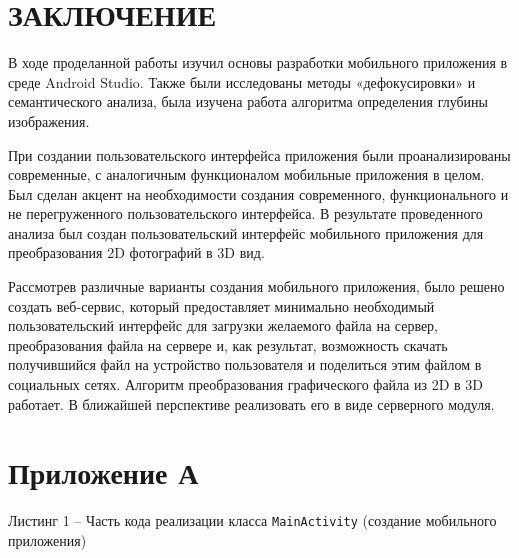 \documentclass[a4paper,12pt]{article}
\begin{document}
\section*{\centering ЗАКЛЮЧЕНИЕ}

В ходе проделанной работы изучил основы разработки мобильного приложения в среде Android Studio. Также были исследованы методы «дефокусировки» и семантического анализа, была изучена работа алгоритма определения глубины изображения.

При создании пользовательского интерфейса приложения были проанализированы современные, с аналогичным функционалом мобильные приложения в целом. Был сделан акцент на необходимости создания современного, функционального и не перегруженного пользовательского интерфейса. В результате проведенного анализа был создан пользовательский интерфейс мобильного приложения для преобразования 2D фотографий в 3D вид.

Рассмотрев различные варианты создания мобильного приложения, было решено создать веб-сервис, который предоставляет минимально необходимый пользовательский интерфейс для загрузки желаемого файла на сервер, преобразования файла на сервере и, как результат, возможность скачать получившийся файл на устройство пользователя и поделиться этим файлом в социальных сетях. Алгоритм преобразования графического файла из 2D в 3D работает. В ближайшей перспективе реализовать его в виде серверного модуля. 


\pagebreak

\printbibliography

\pagebreak

\section*{ \centering Приложение А} 

\begin{center}
	Листинг 1 -- Часть кода реализации класса \verb|MainActivity| (создание мобильного приложения)
\end{center}
\end{document}
